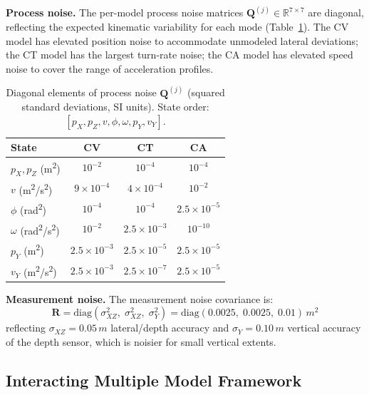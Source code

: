 \documentclass[conference]{IEEEtran}
\begin{document}
\textbf{Process noise.} The per-model process noise matrices $\mathbf{Q}^{(j)} \in \mathbb{R}^{7 \times 7}$ are diagonal, reflecting the expected kinematic variability for each mode (Table~\ref{tab:Q}). The CV model has elevated position noise to accommodate unmodeled lateral deviations; the CT model has the largest turn-rate noise; the CA model has elevated speed noise to cover the range of acceleration profiles.

\begin{table}[!t]
\centering
\caption{Diagonal elements of process noise $\mathbf{Q}^{(j)}$ (squared standard deviations, SI units). State order: $[p_X, p_Z, v, \phi, \omega, p_Y, v_Y]$.}
\label{tab:Q}
\begin{tabular}{@{}lccc@{}}
\toprule
\textbf{State} & \textbf{CV} & \textbf{CT} & \textbf{CA} \\
\midrule
$p_X, p_Z$ (\si{m^2})       & $10^{-2}$ & $10^{-4}$ & $10^{-4}$ \\
$v$ (\si{m^2/s^2})          & $9 \times 10^{-4}$ & $4 \times 10^{-4}$ & $10^{-2}$ \\
$\phi$ (\si{rad^2})         & $10^{-4}$ & $10^{-4}$ & $2.5 \times 10^{-5}$ \\
$\omega$ (\si{rad^2/s^2})   & $10^{-2}$ & $2.5 \times 10^{-3}$ & $10^{-10}$ \\
$p_Y$ (\si{m^2})            & $2.5 \times 10^{-3}$ & $2.5 \times 10^{-5}$ & $2.5 \times 10^{-5}$ \\
$v_Y$ (\si{m^2/s^2})        & $2.5 \times 10^{-3}$ & $2.5 \times 10^{-7}$ & $2.5 \times 10^{-5}$ \\
\bottomrule
\end{tabular}
\end{table}

\textbf{Measurement noise.} The measurement noise covariance is:
\begin{equation}
\label{eq:R}
\mathbf{R} = \text{diag}\!\left(\sigma_{XZ}^2,\; \sigma_{XZ}^2,\; \sigma_Y^2\right) = \text{diag}\!\left(0.0025,\; 0.0025,\; 0.01\right)\,\si{m^2}
\end{equation}
reflecting $\sigma_{XZ} = 0.05\,\si{m}$ lateral/depth accuracy and $\sigma_Y = 0.10\,\si{m}$ vertical accuracy of the depth sensor, which is noisier for small vertical extents.

\subsection{Interacting Multiple Model Framework}
\label{sec:imm}
\end{document}
